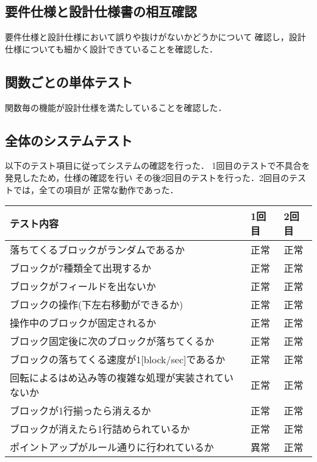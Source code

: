 \subsection{要件仕様と設計仕様書の相互確認}
要件仕様と設計仕様において誤りや抜けがないかどうかについて
確認し，設計仕様についても細かく設計できていることを確認した．
\subsection{関数ごとの単体テスト}
関数毎の機能が設計仕様を満たしていることを確認した．
\subsection{全体のシステムテスト}
以下のテスト項目に従ってシステムの確認を行った．
1回目のテストで不具合を発見したため，仕様の確認を行い
その後2回目のテストを行った．2回目のテストでは，全ての項目が
正常な動作であった．
\begin{table}[htb]
\begin{tabular}{|l|l|l|}
\hline
テスト内容                             & 1回目 & 2回目 \\ \hline
落ちてくるブロックがランダムであるか                & 正常  & 正常  \\ \hline
ブロックが7種類全て出現するか                   & 正常  & 正常  \\ \hline
ブロックがフィールドを出ないか                   & 正常  & 正常  \\ \hline
ブロックの操作(下左右移動ができるか)               & 正常  & 正常  \\ \hline
操作中のブロックが固定されるか                   & 正常  & 正常  \\ \hline
ブロック固定後に次のブロックが落ちてくるか             & 正常  & 正常  \\ \hline
ブロックの落ちてくる速度が1{[}block/sec{]}であるか & 正常  & 正常  \\ \hline
回転によるはめ込み等の複雑な処理が実装されていないか        & 正常  & 正常  \\ \hline
ブロックが1行揃ったら消えるか                   & 正常  & 正常  \\ \hline
ブロックが消えたら1行詰められているか               & 正常  & 正常  \\ \hline
ポイントアップがルール通りに行われているか             & 異常  & 正常  \\ \hline
\end{tabular}
\end{table}

